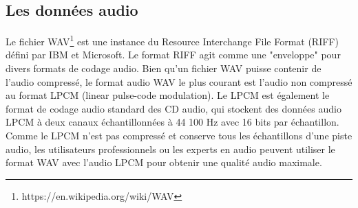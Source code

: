 \subsection*{Les données audio}
Le fichier WAV\footnote{https://en.wikipedia.org/wiki/WAV} est une instance du Resource Interchange File Format (RIFF) défini par IBM et Microsoft. Le format RIFF agit comme une "enveloppe" pour divers formats de codage audio.
Bien qu'un fichier WAV puisse contenir de l'audio compressé, le format audio WAV le plus courant est l'audio non compressé au format LPCM (linear pulse-code modulation). Le LPCM est également le format de codage audio standard des CD audio, qui stockent des données audio LPCM à deux canaux échantillonnées à 44 100 Hz avec 16 bits par échantillon. Comme le LPCM n'est pas compressé et conserve tous les échantillons d'une piste audio, les utilisateurs professionnels ou les experts en audio peuvent utiliser le format WAV avec l'audio LPCM pour obtenir une qualité audio maximale.
